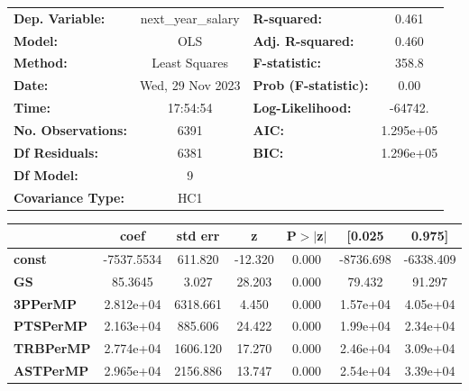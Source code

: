 \begin{center}
\begin{tabular}{lclc}
\toprule
\textbf{Dep. Variable:}    & next\_year\_salary & \textbf{  R-squared:         } &     0.461   \\
\textbf{Model:}            &        OLS         & \textbf{  Adj. R-squared:    } &     0.460   \\
\textbf{Method:}           &   Least Squares    & \textbf{  F-statistic:       } &     358.8   \\
\textbf{Date:}             &  Wed, 29 Nov 2023  & \textbf{  Prob (F-statistic):} &     0.00    \\
\textbf{Time:}             &      17:54:54      & \textbf{  Log-Likelihood:    } &   -64742.   \\
\textbf{No. Observations:} &         6391       & \textbf{  AIC:               } & 1.295e+05   \\
\textbf{Df Residuals:}     &         6381       & \textbf{  BIC:               } & 1.296e+05   \\
\textbf{Df Model:}         &            9       & \textbf{                     } &             \\
\textbf{Covariance Type:}  &        HC1         & \textbf{                     } &             \\
\bottomrule
\end{tabular}
\begin{tabular}{lcccccc}
                       & \textbf{coef} & \textbf{std err} & \textbf{z} & \textbf{P$> |$z$|$} & \textbf{[0.025} & \textbf{0.975]}  \\
\midrule
\textbf{const}         &   -7537.5534  &      611.820     &   -12.320  &         0.000        &    -8736.698    &    -6338.409     \\
\textbf{GS}            &      85.3645  &        3.027     &    28.203  &         0.000        &       79.432    &       91.297     \\
\textbf{3PPerMP}       &    2.812e+04  &     6318.661     &     4.450  &         0.000        &     1.57e+04    &     4.05e+04     \\
\textbf{PTSPerMP}      &    2.163e+04  &      885.606     &    24.422  &         0.000        &     1.99e+04    &     2.34e+04     \\
\textbf{TRBPerMP}      &    2.774e+04  &     1606.120     &    17.270  &         0.000        &     2.46e+04    &     3.09e+04     \\
\textbf{ASTPerMP}      &    2.965e+04  &     2156.886     &    13.747  &         0.000        &     2.54e+04    &     3.39e+04     \\

\end{tabular}
\end{center}
